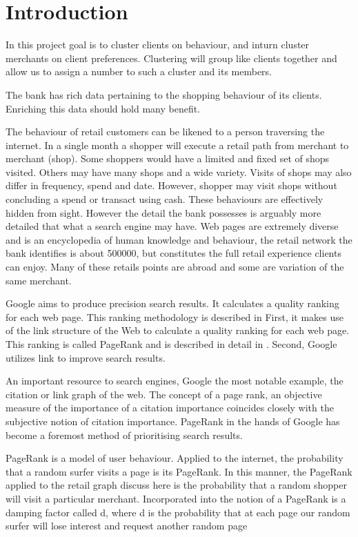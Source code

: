 
\section{Introduction}

In this project goal is to cluster clients on behaviour, and inturn cluster merchants on client preferences.  Clustering will group like clients together and allow us to assign a number to such a cluster and its members.  

The bank has rich data pertaining to the shopping behaviour of its clients.
Enriching this data should hold many benefit.

The behaviour of retail customers can be likened to a person traversing the internet.  In a single month a shopper will execute a retail path from merchant to merchant (shop).  Some shoppers would have a limited and fixed set of shops visited.  Others may have many shops and a wide variety.  Visits of shops may also differ in frequency, spend and date.  However, shopper may visit shops without concluding a spend or transact using cash.  These behaviours are effectively hidden from sight.  However the detail the bank possesses is arguably more detailed that what a search engine may have. Web pages are extremely diverse and is an encyclopedia of human knowledge and behaviour, the retail network the bank identifies is about 500000, but constitutes the full retail experience clients can enjoy.  Many of these retails points are abroad and some are variation of the same merchant.

Google aims to produce precision search results. It calculates a quality ranking for each web page. This ranking methodology is described in First, it makes use of the link structure of the Web to calculate a quality ranking for each web page. This ranking is called PageRank and is described in detail in \citep{brin_page_1998}. Second, Google utilizes link to improve search results.

An important resource to search engines, Google the most notable example, the citation or link graph of the web.  The concept of a page rank, an objective measure of the importance of a citation importance coincides closely with the subjective notion of citation importance.  PageRank in the hands of Google has become a foremost method of prioritising search results.

PageRank is a model of user behaviour. Applied to the internet, the probability that a random surfer visits a page is its PageRank.  In this manner, the PageRank applied to the retail graph discuss here is the probability that a random shopper will visit a particular merchant.  Incorporated into the notion of a PageRank is a damping factor called d, where d is the probability that at each page our random surfer will lose interest and request another random page

